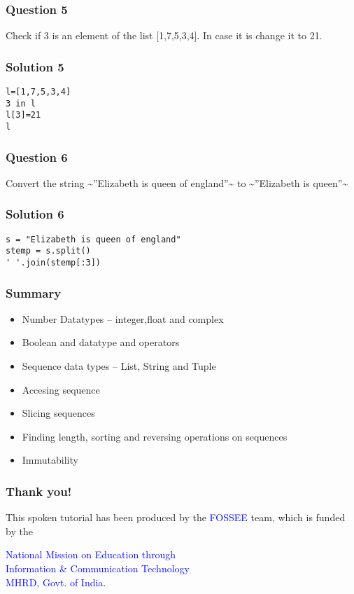 \documentclass[presentation]{beamer}
\begin{document}
\begin{frame}
\frametitle{Question 5}
\label{sec-15}

  Check if 3 is an element of the list [1,7,5,3,4]. In case it is
change it to 21.
\end{frame}
\begin{frame}[fragile]
\frametitle{Solution 5}
\label{sec-16}

\begin{verbatim}
l=[1,7,5,3,4]
3 in l
l[3]=21
l
\end{verbatim}
\end{frame}
\begin{frame}
\frametitle{Question 6}
\label{sec-17}

  Convert the string \~{}''Elizabeth is queen of england''\~{} to \~{}''Elizabeth is
queen''\~{}
\end{frame}
\begin{frame}[fragile]
\frametitle{Solution 6}
\label{sec-18}

\begin{verbatim}
s = "Elizabeth is queen of england"                                                                                                                 
stemp = s.split()                                                                                                                                   
' '.join(stemp[:3])
\end{verbatim}
\end{frame}
\begin{frame}
\frametitle{Summary}
\label{sec-19}

\begin{itemize}
\item Number Datatypes -- integer,float and complex
\item Boolean and datatype and operators
\item Sequence data types -- List, String and Tuple
\item Accesing sequence
\item Slicing sequences
\item Finding length, sorting and reversing operations on sequences
\item Immutability
\end{itemize}
\end{frame}
\begin{frame}
\frametitle{Thank you!}
\label{sec-20}

  \begin{block}{}
  \begin{center}
  This spoken tutorial has been produced by the
  \textcolor{blue}{FOSSEE} team, which is funded by the 
  \end{center}
  \begin{center}
    \textcolor{blue}{National Mission on Education through \\
      Information \& Communication Technology \\ 
      MHRD, Govt. of India}.
  \end{center}  
  \end{block}
\end{frame}
\end{document}
